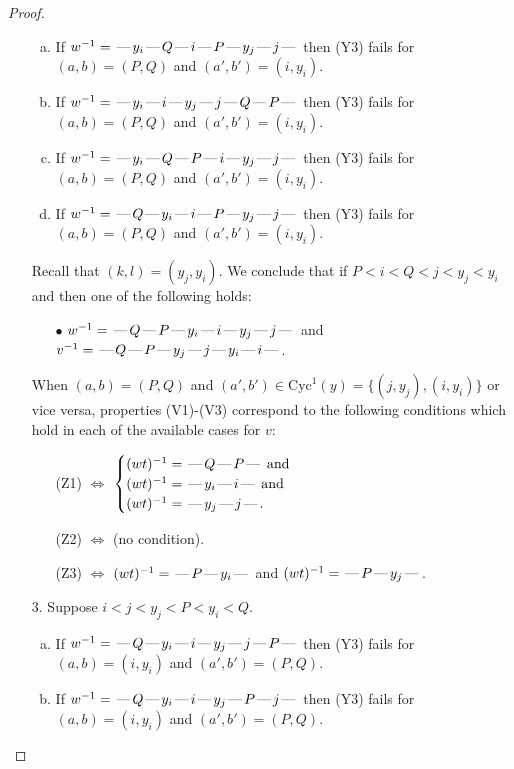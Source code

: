 \documentclass[10pt]{article}
\theoremstyle{definition}
\theoremstyle{definition}
\def\dash{\text{\hspace{0.5mm}---\hspace{0.5mm}}}
\def\Cyc{\mathrm{Cyc}}
\begin{document}
\begin{proof}
\begin{enumerate}
\begin{enumerate}[(a)]
\item If $w^{-1} = \dash y_i\dash Q\dash i\dash P\dash y_j\dash j\dash $ then (Y3) fails for $(a,b)=(P,Q)$ and $(a',b')=(i,y_i)$.
\item If $w^{-1} = \dash y_i\dash i\dash y_j\dash j\dash Q\dash P\dash $ then (Y3) fails for $(a,b)=(P,Q)$ and $(a',b')=(i,y_i)$.
\item If $w^{-1} = \dash y_i\dash Q\dash P\dash i\dash y_j\dash j\dash $ then (Y3) fails for $(a,b)=(P,Q)$ and $(a',b')=(i,y_i)$.
\item If $w^{-1} = \dash Q\dash y_i\dash i\dash P\dash y_j\dash j\dash $ then (Y3) fails for $(a,b)=(P,Q)$ and $(a',b')=(i,y_i)$.
\end{enumerate}
Recall that $(k,l) = (y_j,y_i)$.
We conclude that if $P < i < Q < j < y_j < y_i$ and then one of the following holds:
\begin{enumerate}
\item[$\bullet$] $w^{-1} = \dash Q\dash P\dash y_i\dash i\dash y_j\dash j\dash $ and $v^{-1} = \dash Q\dash P\dash y_j\dash j\dash y_i\dash i\dash $.
\end{enumerate}
When $(a,b)= (P,Q)$ and $(a',b')\in \Cyc^1(y)=\{(j,y_j),(i,y_i)\}$ or vice versa,
properties (V1)-(V3) correspond to the following conditions which hold in
each of the available cases for $v$:
\begin{enumerate}
\item[](Z1) $\Leftrightarrow$ $\begin{cases}\text{$(wt)^{-1} = \dash Q \dash P \dash$}\text{ and }\\
\text{$(wt)^{-1} = \dash y_i \dash i \dash$}\text{ and }\\
\text{$(wt)^{-1} = \dash y_j \dash j \dash$}.\end{cases}$
\item[](Z2) $\Leftrightarrow$ (no condition).
\item[](Z3) $\Leftrightarrow$ $(wt)^{-1} = \dash P \dash y_i \dash$  and $(wt)^{-1} = \dash P \dash y_j \dash$.
\end{enumerate}
\item[$3$.] Suppose $i < j < y_j < P < y_i < Q$.
\begin{enumerate}[(a)]
\item If $w^{-1} = \dash Q\dash y_i\dash i\dash y_j\dash j\dash P\dash $ then (Y3) fails for $(a,b)=(i,y_i)$ and $(a',b')=(P,Q)$.
\item If $w^{-1} = \dash Q\dash y_i\dash i\dash y_j\dash P\dash j\dash $ then (Y3) fails for $(a,b)=(i,y_i)$ and $(a',b')=(P,Q)$.

\end{enumerate}
\end{enumerate}
\end{proof}
\end{document}
